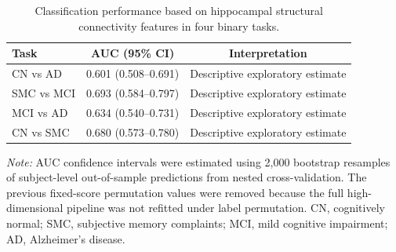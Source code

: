 \documentclass{article}
\begin{document}
\begin{table}[!htbp]
\centering
\caption{Classification performance based on hippocampal structural connectivity features in four binary tasks.}
\label{tab:tableS12}
\footnotesize
\setlength{\tabcolsep}{4pt}
\begin{tabular}{@{}lcc@{}}
\toprule
\textbf{Task} & \textbf{AUC (95\% CI)} & \textbf{Interpretation}\\
\midrule
CN vs AD & 0.601 (0.508--0.691) & Descriptive exploratory estimate \\
SMC vs MCI & 0.693 (0.584--0.797) & Descriptive exploratory estimate \\
MCI vs AD & 0.634 (0.540--0.731) & Descriptive exploratory estimate \\
CN vs SMC & 0.680 (0.573--0.780) & Descriptive exploratory estimate \\

\bottomrule
\end{tabular}

\vspace{1mm}
\footnotesize{\textit{Note:} AUC confidence intervals were estimated using 2,000 bootstrap resamples of subject-level out-of-sample predictions from nested cross-validation. The previous fixed-score permutation values were removed because the full high-dimensional pipeline was not refitted under label permutation. CN, cognitively normal; SMC, subjective memory complaints; MCI, mild cognitive impairment; AD, Alzheimer's disease.}

\end{table}
\end{document}

